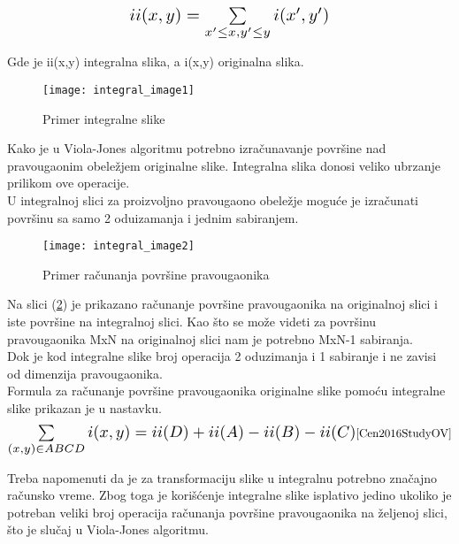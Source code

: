 \begin{equation}
  \Scale[1.4]{ii(x,y)=\sum\limits_{x'\leq x, y'\leq y} i(x',y')}
  \label{IntegralImage_eq1}
\end{equation}

Gde je ii(x,y) integralna slika, a i(x,y) originalna slika. \\

\begin{figure}[H]
  \centering
  \texttt{[image: integral\_image1]}
  \caption{Primer integralne slike}
  \label{IntegralImage_img1}
\end{figure}

Kako je u Viola-Jones algoritmu potrebno izračunavanje površine nad pravougaonim
obeležjem originalne slike.
Integralna slika donosi veliko ubrzanje prilikom ove operacije. \\
U integralnoj slici za proizvoljno pravougaono obeležje moguće je izračunati
površinu sa samo 2 oduizamanja i jednim sabiranjem. \\

\begin{figure}[H]
  \centering
  \texttt{[image: integral\_image2]}
  \caption{Primer računanja površine pravougaonika \cite{IntegralImage1_web}}
  \label{IntegralImage_img2}
\end{figure}

Na slici (\ref{IntegralImage_img2}) je prikazano računanje površine pravougaonika na
originalnoj slici i iste površine na integralnoj slici.
Kao što se može videti za površinu pravougaonika MxN na originalnoj slici nam je
potrebno MxN-1 sabiranja. \\
Dok je kod integralne slike broj operacija 2 oduzimanja i 1 sabiranje i ne
zavisi od dimenzija pravougaonika. \\

Formula za računanje površine pravougaonika originalne slike pomoću integralne
slike prikazan je u nastavku. \\

\begin{equation}
  \Scale[1.4]{\sum\limits_{(x,y)\in ABCD} i(x,y)=ii(D)+ii(A)-ii(B)-ii(C)}
  \cite{Cen2016StudyOV}
  \label{IntegralImage_eq2}
\end{equation}

Treba napomenuti da je za transformaciju slike u integralnu potrebno značajno
računsko vreme.
Zbog toga je korišćenje integralne slike isplativo jedino ukoliko je potreban
veliki broj operacija računanja površine pravougaonika na željenoj slici, što je
slučaj u Viola-Jones algoritmu. \\


